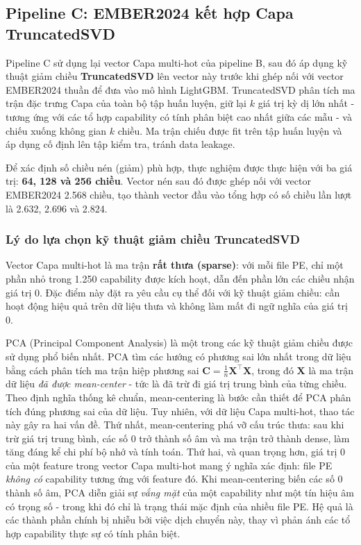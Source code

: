 \subsection{Pipeline C: EMBER2024 kết hợp Capa TruncatedSVD}

Pipeline C sử dụng lại vector Capa multi-hot của pipeline B,
sau đó áp dụng kỹ thuật giảm chiều \textbf{TruncatedSVD} lên
vector này trước khi ghép nối với vector EMBER2024 thuần
để đưa vào mô hình LightGBM. TruncatedSVD phân tích ma trận
đặc trưng Capa của toàn bộ tập huấn luyện, giữ lại $k$ giá
trị kỳ dị lớn nhất - tương ứng với các tổ
hợp capability có tính phân biệt cao nhất giữa các mẫu - và chiếu
xuống không gian $k$ chiều. Ma trận chiếu được fit trên
tập huấn luyện và áp dụng cố định lên tập kiểm tra, tránh data
leakage.

Để xác định số chiều nén (giảm) phù hợp, thực nghiệm được thực hiện với ba
giá trị: \textbf{64, 128 và 256 chiều}. Vector nén sau đó được ghép
nối với vector EMBER2024 2.568 chiều, tạo thành vector đầu vào tổng
hợp có số chiều lần lượt là 2.632, 2.696 và 2.824.

\subsubsection{Lý do lựa chọn kỹ thuật giảm chiều TruncatedSVD}

Vector Capa multi-hot là ma trận \textbf{rất thưa (sparse)}: với mỗi
file PE, chỉ một phần nhỏ trong 1.250 capability được kích hoạt, dẫn
đến phần lớn các chiều nhận giá trị 0. Đặc điểm này đặt ra yêu cầu
cụ thể đối với kỹ thuật giảm chiều: cần hoạt động hiệu quả trên dữ
liệu thưa và không làm mất đi ngữ nghĩa của giá trị 0.

PCA (Principal Component Analysis) là một trong các kỹ thuật giảm
chiều được sử dụng phổ biến nhất. PCA tìm các hướng có phương sai lớn
nhất trong dữ liệu bằng cách phân tích ma trận hiệp phương sai
$\mathbf{C} = \frac{1}{n}\mathbf{X}^\top\mathbf{X}$, trong đó
$\mathbf{X}$ là ma trận dữ liệu \textit{đã được mean-center} - tức
là đã trừ đi giá trị trung bình của từng chiều. Theo định nghĩa
thống kê chuẩn, mean-centering là bước cần thiết để PCA phân tích
đúng phương sai của dữ liệu. Tuy nhiên, với dữ liệu Capa multi-hot,
thao tác này gây ra hai vấn đề. Thứ nhất, mean-centering phá vỡ cấu trúc thưa: sau khi trừ giá trị
trung bình, các số 0 trở thành số âm và ma trận trở thành dense, làm
tăng đáng kể chi phí bộ nhớ và tính toán. Thứ hai, và quan trọng
hơn, giá trị 0 của một feature trong vector Capa multi-hot mang ý nghĩa xác định:
file PE \textit{không có} capability tương ứng với feature đó. Khi mean-centering biến các
số 0 thành số âm, PCA diễn giải sự \textit{vắng mặt} của một
capability như một tín hiệu âm có trọng số - trong khi đó chỉ là
trạng thái mặc định của nhiều file PE. Hệ quả là các thành phần
chính bị nhiễu bởi việc dịch chuyển này, thay vì phản ánh các tổ
hợp capability thực sự có tính phân biệt.

